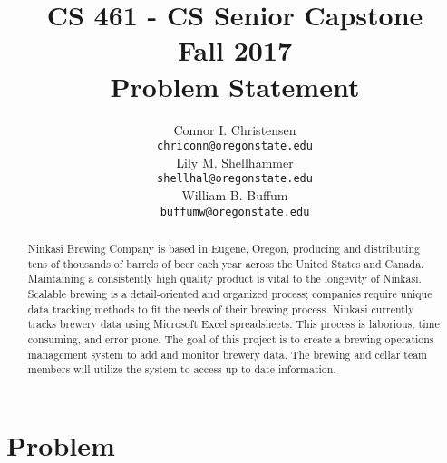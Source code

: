 \documentclass[draftclsnofoot,onecolumn,letterpaper,10pt]{IEEEtran}
\title{CS 461 - CS Senior Capstone
	\\Fall 2017
	\\Problem Statement
}
\author{
	Connor I. Christensen \\
	\texttt{chriconn@oregonstate.edu}
	\\
	Lily M. Shellhammer \\
	\texttt{shellhal@oregonstate.edu}
	\\
	William B. Buffum \\
	\texttt{buffumw@oregonstate.edu}
}
\begin{document}
\begin{titlingpage}
    \maketitle
    \begin{abstract}
					Ninkasi Brewing Company is based in Eugene, Oregon, producing and distributing tens of thousands of barrels of beer each year across the United States and Canada. Maintaining a consistently high quality product is vital to the longevity of Ninkasi. Scalable brewing is a detail-oriented and organized process; companies require unique data tracking methods to fit the needs of their brewing process. Ninkasi currently tracks brewery data using Microsoft Excel spreadsheets. This process is laborious, time consuming, and error prone. The goal of this project is to create a brewing operations management system to add and monitor brewery data. The brewing and cellar team members will utilize the system to access up-to-date information.

    \end{abstract}
\end{titlingpage}

\section{\textbf{Problem}}
\end{document}
